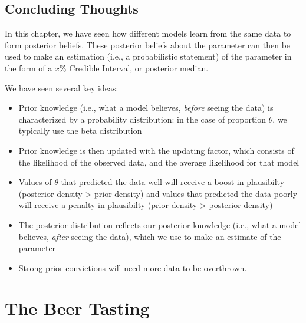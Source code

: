 \documentclass[
  letterpaper,
  DIV=11,
  numbers=noendperiod]{scrreprt}
\providecommand{\tightlist}{%
  \setlength{\itemsep}{0pt}\setlength{\parskip}{0pt}}\usepackage{longtable,booktabs,array}
\begin{document}
\hypertarget{concluding-thoughts-1}{%
\section{Concluding Thoughts}\label{concluding-thoughts-1}}

In this chapter, we have seen how different models learn from the same
data to form posterior beliefs. These posterior beliefs about the
parameter can then be used to make an estimation (i.e., a probabilistic
statement) of the parameter in the form of a \(x\%\) Credible Interval,
or posterior median.

We have seen several key ideas:

\begin{itemize}
\tightlist
\item
  Prior knowledge (i.e., what a model believes, \emph{before} seeing the
  data) is characterized by a probability distribution: in the case of
  proportion \(\theta\), we typically use the beta distribution
\item
  Prior knowledge is then updated with the updating factor, which
  consists of the likelihood of the observed data, and the average
  likelihood for that model
\item
  Values of \(\theta\) that predicted the data well will receive a boost
  in plausibilty (posterior density \textgreater{} prior density) and
  values that predicted the data poorly will receive a penalty in
  plausibilty (prior density \textgreater{} posterior density)
\item
  The posterior distribution reflects our posterior knowledge (i.e.,
  what a model believes, \emph{after} seeing the data), which we use to
  make an estimate of the parameter
\item
  Strong prior convictions will need more data to be overthrown.
\end{itemize}


\hypertarget{the-beer-tasting}{%
\chapter{The Beer Tasting}\label{the-beer-tasting}}
\end{document}
